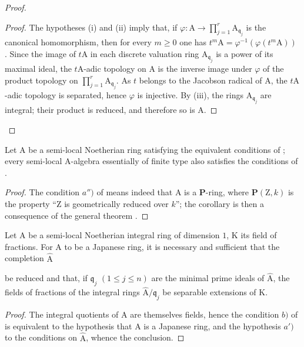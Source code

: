 \begin{proof}
\begin{proof}
The hypotheses (i) and (ii) imply that, if $\varphi:\mathrm{A}\to\prod_{j=1}^r\mathrm{A}_{\mathfrak{q}_j}$ is the canonical homomorphism, then for every $m\geqslant 0$ one has $t^m\mathrm{A}=\varphi^{-1}(\varphi(t^m\mathrm{A}))$ . Since the image of $t\mathrm{A}$ in each discrete valuation ring $\mathrm{A}_{\mathfrak{q}_j}$ is a power of its maximal ideal, the $t\mathrm{A}$-adic topology on $\mathrm{A}$ is the inverse image under $\varphi$ of the product topology on $\prod_{j=1}^r\mathrm{A}_{\mathfrak{q}_j}$. As $t$ belongs to the Jacobson radical of $\mathrm{A}$, the $t\mathrm{A}$-adic topology is separated, hence $\varphi$ is injective. By (iii), the rings $\mathrm{A}_{\mathfrak{q}_j}$ are integral; their product is reduced, and therefore so is $\mathrm{A}$.
\end{proof}
\end{proof}

\begin{corollary}[7.6.5]
\label{IV.7.6.5}
Let $\mathrm{A}$ be a semi-local Noetherian ring satisfying the equivalent conditions of ; every semi-local $\mathrm{A}$-algebra essentially of finite type also satisfies the conditions of .
\end{corollary}

\begin{proof}
The condition $a'')$ of  means indeed that $\mathrm{A}$ is a $\boldsymbol{P}$-ring, where $\boldsymbol{P}(\mathrm{Z},k)$ is the property ``$\mathrm{Z}$ is geometrically reduced over $k$''; the corollary is then a consequence of the general theorem .
\end{proof}

\begin{corollary}[7.6.6]
\label{IV.7.6.6}
Let $\mathrm{A}$ be a semi-local Noetherian integral ring of dimension $1$, $\mathrm{K}$ its field of fractions. For $\mathrm{A}$ to be a Japanese ring, it is necessary and sufficient that the completion $\widehat{\mathrm{A}}$


be reduced and that, if $\mathfrak{q}_j$ $(1\leqslant j\leqslant n)$ are the minimal prime ideals of $\widehat{\mathrm{A}}$, the fields of fractions of the integral rings $\widehat{\mathrm{A}}/\mathfrak{q}_j$ be separable extensions of $\mathrm{K}$.
\end{corollary}

\begin{proof}
The integral quotients of $\mathrm{A}$ are themselves fields, hence the condition $b)$ of  is equivalent to the hypothesis that $\mathrm{A}$ is a Japanese ring, and the hypothesis $a')$ to the conditions on $\widehat{\mathrm{A}}$, whence the conclusion.
\end{proof}

